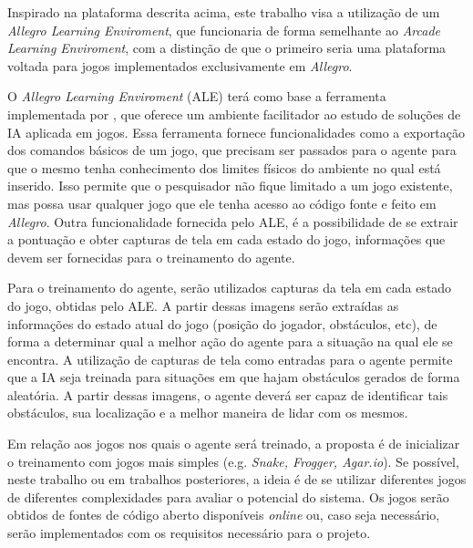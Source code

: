  Inspirado na plataforma descrita acima, este trabalho visa a utilização de um \textit{Allegro Learning Enviroment}, que funcionaria de forma semelhante ao \textit{Arcade Learning Enviroment}, com a distinção de que o primeiro seria uma plataforma voltada para jogos implementados exclusivamente em \textit{Allegro}.

 O \textit{Allegro Learning Enviroment} (ALE) terá como base a ferramenta implementada por \cite{silva:amb-jd-allegro}, que oferece um ambiente facilitador ao estudo de soluções de IA aplicada em jogos. Essa ferramenta fornece funcionalidades como a exportação dos comandos básicos de um jogo, que precisam ser passados para o agente para que o mesmo tenha conhecimento dos limites físicos do ambiente no qual está inserido. Isso permite que o pesquisador não fique limitado a um jogo existente, mas possa usar qualquer jogo que ele tenha acesso ao código fonte e feito em \textit{Allegro}. Outra funcionalidade fornecida pelo ALE, é a possibilidade de se extrair a pontuação e obter capturas de tela em cada estado do jogo, informações que devem ser fornecidas para o treinamento do agente.

 Para o treinamento do agente, serão utilizados capturas da tela em cada estado do jogo, obtidas pelo ALE. A partir dessas imagens serão extraídas  as informações do estado atual do jogo (posição do jogador, obstáculos, etc), de forma a determinar qual a melhor ação do agente para a situação na qual ele se encontra. A utilização de capturas de tela como entradas para o agente permite que a IA seja treinada para situações em que hajam obstáculos gerados de forma aleatória. A partir dessas imagens, o agente deverá ser capaz de identificar tais obstáculos, sua localização e a melhor maneira de lidar com os mesmos.

 Em relação aos jogos nos quais o agente será treinado, a proposta é de inicializar o treinamento com jogos mais simples (e.g. \textit{Snake, Frogger, Agar.io}). Se possível, neste trabalho ou em trabalhos posteriores, a ideia é de se utilizar diferentes jogos de diferentes complexidades para avaliar o potencial do sistema. Os jogos serão obtidos de fontes de código aberto disponíveis \textit{online} ou, caso seja necessário, serão implementados com os requisitos necessário para o projeto.




 




